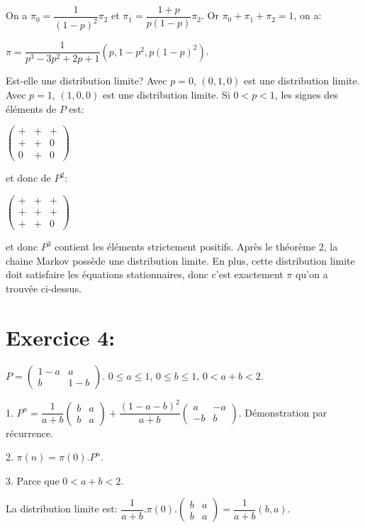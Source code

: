 \documentclass[a4paper,twoside,12pt]{article}
\begin{document}
On a $\pi_0 = \dfrac{1}{(1-p)^2}\pi_2$ et $\pi_1 = \dfrac{1+p}{p(1-p)}\pi_2$. Or $\pi_0 + \pi_1 + \pi_2 = 1$, on a:

$\pi = \dfrac{1}{p^3 - 3p^2 + 2p + 1}\left( p, 1-p^2, p(1-p)^2\right)$.

Est-elle une distribution limite? Avec $p=0$, $(0, 1, 0)$ est une distribution limite. Avec $p = 1$, $(1, 0, 0)$ est une distribution limite. Si $0 < p < 1$, les signes des éléments de $P$ est:

$\left(
\begin{array}{ccc}
    + & + & + \\
    + & + & 0 \\
    0 & + & 0
\end{array}
\right)$

et donc de $P^2$:

$\left(
\begin{array}{ccc}
    + & + & + \\
    + & + & + \\
    + & + & 0
\end{array}
\right)$

et donc $P^3$ contient les éléments strictement positifs. Après le théorème 2, la chaine Markov possède une distribution limite. En plus, cette distribution limite doit satisfaire les équations stationnaires, donc c'est exactement $\pi$ qu'on a trouvée ci-dessus.

\section{Exercice 4:}
$P = \left(
\begin{array}{cc}
    1-a & a \\
    b & 1-b
\end{array}
\right)$. $0 \leq a \leq 1$, $0 \leq b \leq 1$, $0 < a+b < 2$.

1. $P^n = \dfrac{1}{a+b}\left(\begin{array}{cc}
    b & a\\
    b & a
\end{array}\right) + \dfrac{(1-a-b)^2}{a+b}\left(\begin{array}{cc}
    a & -a \\
    -b & b
\end{array}\right)$. Démonstration par récurrence.

2. $\pi(n) = \pi(0).P^n$.

3. Parce que $0 < a+b < 2$.

La distribution limite est: $\dfrac{1}{a+b}.\pi(0).\left(\begin{array}{cc}
    b & a\\
    b & a
\end{array}\right) = \dfrac{1}{a+b}(b, a)$.
\end{document}
